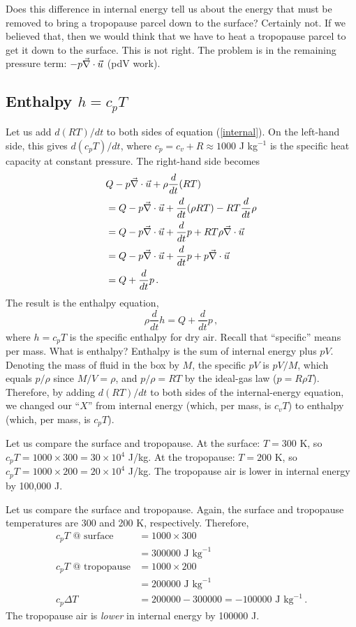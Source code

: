 \documentclass[12pt]{article}
\begin{document}
Does this difference in internal energy tell us about the energy that must be removed to bring a tropopause parcel down to the surface?  Certainly not.  If we believed that, then we would think that we have to heat a tropopause parcel to get it down to the surface.  This is not right.  The problem is in the remaining pressure term: $-p{\vec{\nabla}}\cdot \vec{u}$ (pdV work).


\subsection{Enthalpy $h = c_pT$}


Let us add $d(RT)/dt$ to both sides of equation (\ref{internal}).  On the left-hand side, this gives $d(c_p T)/dt$, where $c_p = c_v + R \approx 1000$ J kg$^{-1}$ is the specific heat capacity at constant pressure.  The right-hand side becomes
\begin{align}
& Q - p {\vec{\nabla}} \cdot \vec{u} + \rho \frac{d}{dt} (RT) \\
&= Q - p {\vec{\nabla}} \cdot \vec{u} + \frac{d}{dt}(\rho RT) - RT \frac{d}{dt} \rho \\
&= Q - p {\vec{\nabla}} \cdot \vec{u} + \frac{d}{dt} p + RT \rho {\vec{\nabla}} \cdot \vec{u} \\
&= Q - p {\vec{\nabla}} \cdot \vec{u} + \frac{d}{dt} p + p {\vec{\nabla}} \cdot \vec{u} \\
&= Q + \frac{d}{dt} p \, .
\end{align}
The result is the enthalpy equation,
\begin{equation}
\rho \frac{d}{dt} h = Q + \frac{d}{dt} p \, , \label{enthalpy}
\end{equation}
where $h = c_p T$ is the specific enthalpy for dry air.  Recall that ``specific'' means per mass.  What is enthalpy?  Enthalpy is the sum of internal energy plus $pV$.  Denoting the mass of fluid in the box by $M$, the specific $pV$ is $pV/M$, which equals $p/\rho$ since $M/V = \rho$, and $p/\rho = RT$ by the ideal-gas law ($p = R\rho T$).  Therefore, by adding $d(RT)/dt$ to both sides of the internal-energy equation, we changed our ``$X$'' from internal energy (which, per mass, is $c_v T$) to enthalpy (which, per mass, is $c_p T$).


Let us compare the surface and tropopause.   At the surface: $T = 300$ K, so $c_p T = 1000 \times 300 = 30 \times 10^4$ J/kg.  At the tropopause: $T = 200$ K, so $c_p T = 1000 \times 200 = 20 \times 10^4$ J/kg.  The tropopause air is lower in internal energy by 100,000 J.


Let us compare the surface and tropopause.   Again, the surface and tropopause temperatures are 300 and 200 K, respectively.  Therefore,
\begin{align}
c_pT \text{ @ surface} &= 1000 \times 300 \\
&= \num{300000} \text{ J kg}^{-1} \\
c_pT \text{ @ tropopause} &= 1000 \times 200 \\
&= \num{200000} \text{ J kg}^{-1} \\
c_p \Delta T &= \num{200000}-\num{300000} = -\num{100000} \text{ J kg}^{-1} \, .
\end{align}
The tropopause air is {\it lower} in internal energy by \num{100000} J.
\end{document}
